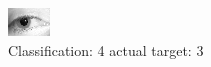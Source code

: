 \begin{figure}[h!]
\begin{center}
\includegraphics[width=0.60\columnwidth]{figures/ID1300_class_4_target_3.png}
\end{center}
\caption{ Classification: 4 actual target: 3}
\label{fig:ID1300_class_4_target_3}
\end{figure}
